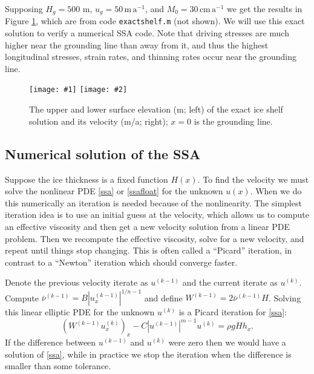 \documentclass[letterpaper,final,12pt,reqno]{amsart}
\newcommand{\twofigsizes}[5]{
\begin{figure}[ht]
\centering
\texttt{[image: \#1]} \quad
\texttt{[image: \#2]}
\caption{#3}
\label{fig:#1}
\end{figure}}
\newcommand{\twofig}[3]{\twofigsizes{#1}{#2}{#3}{2.5in}{2.5in}}
\begin{document}
Supposing $H_g=500$ m, $u_g = 50 \,\text{m}\,\text{a}^{-1}$, and $M_0=30 \,\text{cm}\,\text{a}^{-1}$ we get the results in Figure \ref{fig:steadyshelfprofile}, which are from code \texttt{exactshelf.m} (not shown).  We will use this exact solution to verify a numerical SSA code.  Note that driving stresses are much higher near the grounding line than away from it, and thus the highest longitudinal stresses, strain rates, and thinning rates occur near the grounding line.

\twofig{steadyshelfprofile}{steadyshelfvelocity}{The upper and lower surface elevation (m; left) of the exact ice shelf solution and its velocity (m/a; right); $x=0$ is the grounding line.}

\subsection*{Numerical solution of the SSA}  Suppose the ice thickness is a fixed function $H(x)$.  To find the velocity we must solve the nonlinear PDE \eqref{ssa} or \eqref{ssafloat} for the unknown $u(x)$.  When we do this numerically an iteration is needed because of the nonlinearity.  The simplest iteration idea is to use an initial guess at the velocity, which allows us to compute an effective viscosity and then get a new velocity solution from a linear PDE problem.  Then we recompute the effective viscosity, solve for a new velocity, and repeat until things stop changing.  This is often called a ``Picard'' iteration, in contrast to a ``Newton'' iteration which should converge faster.

Denote the previous velocity iterate as $u^{(k-1)}$ and the current iterate as $u^{(k)}$.  Compute $\bar \nu^{(k-1)} = B |u^{(k-1)}_x|^{1/n-1}$ and define $W^{(k-1)} = 2 \bar \nu^{(k-1)} H$.  Solving this linear elliptic PDE for the unknown $u^{(k)}$ is a Picard iteration for \eqref{ssa}:
\begin{equation}
   \left(W^{(k-1)} u^{(k)}_x\right)_x - C |u^{(k-1)}|^{m-1} u^{(k)} = \rho g H h_x. \label{picardssa}
\end{equation}
If the difference between $u^{(k-1)}$ and $u^{(k)}$ were zero then we would have a solution of \eqref{ssa}, while in practice we stop the iteration when the difference is smaller than some tolerance.
\end{document}

